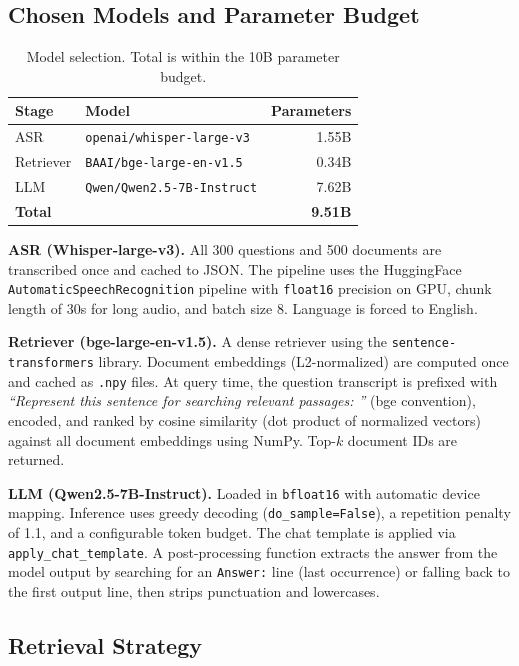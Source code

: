\documentclass[11pt,a4paper]{article}
\begin{document}
\subsection{Chosen Models and Parameter Budget}

\begin{table}[h]
\centering
\begin{tabular}{llr}
\toprule
\textbf{Stage} & \textbf{Model} & \textbf{Parameters} \\
\midrule
ASR       & \texttt{openai/whisper-large-v3}    & 1.55B \\
Retriever & \texttt{BAAI/bge-large-en-v1.5}     & 0.34B \\
LLM       & \texttt{Qwen/Qwen2.5-7B-Instruct}   & 7.62B \\
\midrule
\textbf{Total} & & \textbf{9.51B} \\
\bottomrule
\end{tabular}
\caption{Model selection. Total is within the 10B parameter budget.}
\end{table}

\textbf{ASR (Whisper-large-v3).} All 300 questions and 500 documents are transcribed once and cached to JSON. The pipeline uses the HuggingFace \texttt{AutomaticSpeechRecognition} pipeline with \texttt{float16} precision on GPU, chunk length of 30s for long audio, and batch size 8. Language is forced to English.

\textbf{Retriever (bge-large-en-v1.5).} A dense retriever using the \texttt{sentence-transformers} library. Document embeddings (L2-normalized) are computed once and cached as \texttt{.npy} files. At query time, the question transcript is prefixed with \textit{``Represent this sentence for searching relevant passages: ''} (bge convention), encoded, and ranked by cosine similarity (dot product of normalized vectors) against all document embeddings using NumPy. Top-$k$ document IDs are returned.

\textbf{LLM (Qwen2.5-7B-Instruct).} Loaded in \texttt{bfloat16} with automatic device mapping. Inference uses greedy decoding (\texttt{do\_sample=False}), a repetition penalty of 1.1, and a configurable token budget. The chat template is applied via \texttt{apply\_chat\_template}. A post-processing function extracts the answer from the model output by searching for an \texttt{Answer:} line (last occurrence) or falling back to the first output line, then strips punctuation and lowercases.

\subsection{Retrieval Strategy}
\end{document}

